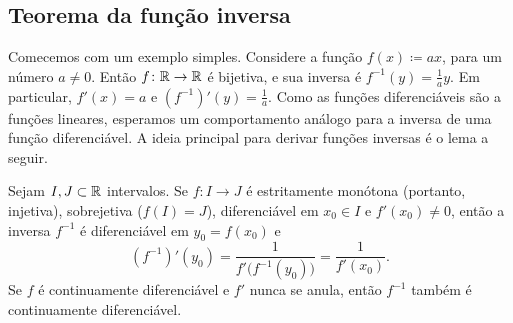 \subsection{Teorema da função inversa}

Comecemos com um exemplo simples. Considere a função $f(x) \coloneqq ax$, para um número $a \neq 0$. Então $f \colon {\mathbb{R}} \to {\mathbb{R}}$ é bijetiva, e sua inversa é $f^{-1}(y)=\frac{1}{a}y$. Em particular, $f'(x)=a$ e $(f^{-1})'(y)=\frac{1}{a}$. Como as funções diferenciáveis são  a funções lineares, esperamos um comportamento análogo para a inversa de uma função diferenciável. A ideia principal para derivar funções inversas é o lema a seguir.

\begin{lemma} \label{lemma:ift}
Sejam $I,J \subset {\mathbb{R}}$ intervalos. Se $f \colon I \to J$ é estritamente monótona (portanto, injetiva), sobrejetiva ($f(I)=J$), diferenciável em $x_0 \in I$ e $f'(x_0) \neq 0$, então a inversa $f^{-1}$ é diferenciável em $y_0=f(x_0)$ e
\begin{equation*}
(f^{-1})'(y_0) = \frac{1}{f'\bigl( f^{-1}(y_0) \bigr)} = \frac{1}{f'(x_0)} .
\end{equation*}
Se $f$ é continuamente diferenciável e $f'$ nunca se anula, então $f^{-1}$ também é continuamente diferenciável.
\end{lemma}

